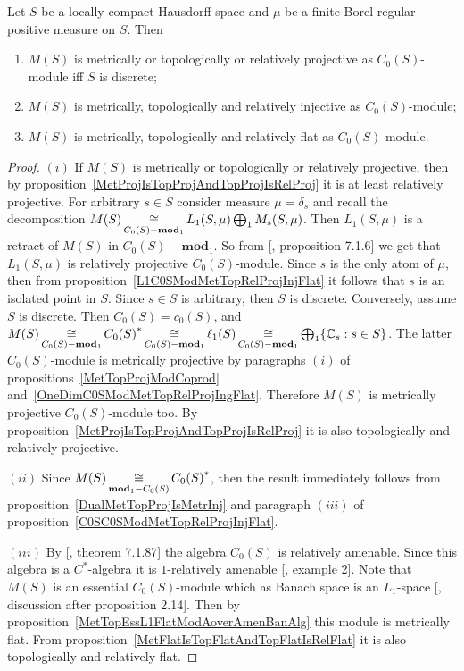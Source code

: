 \begin{proposition}\label{MSC0SModMetTopRelProjIngFlat} Let $S$ be a locally
compact Hausdorff space and $\mu$ be a finite Borel regular positive measure on
$S$. Then

\begin{enumerate}[label = (\roman*)]
    \item $M(S)$ is metrically or topologically or relatively projective as
    $C_0(S)$-module iff $S$ is discrete; 

    \item $M(S)$ is metrically, topologically and relatively injective as
    $C_0(S)$-module; 

    \item $M(S)$ is metrically, topologically and relatively flat as
    $C_0(S)$-module.
\end{enumerate}
\end{proposition}
\begin{proof} $(i)$ If $M(S)$ is metrically or topologically or relatively
projective, then by proposition~\ref{MetProjIsTopProjAndTopProjIsRelProj} it is
at least relatively projective. For arbitrary $s\in S$ consider measure
$\mu=\delta_s$ and recall the decomposition
$M(S)\mathop{\mathbin{\cong}}\limits_{C_0(S)-\mathbf{mod}_1}L_1(S,\mu)\bigoplus_1 M_s(S,\mu)$. Then
$L_1(S,\mu)$ is a retract of $M(S)$ in $C_0(S)-\mathbf{mod}_1$. So from
[\cite{HelBanLocConvAlg}, proposition 7.1.6] we get that $L_1(S,\mu)$ is
relatively projective $C_0(S)$-module. Since $s$ is the only atom of $\mu$, then
from proposition~\ref{L1C0SModMetTopRelProjInjFlat} it follows that $s$ is an
isolated point in $S$. Since $s\in S$ is arbitrary, then $S$ is discrete.
Conversely, assume $S$ is discrete. Then $C_0(S)=c_0(S)$, and
$M(S)
\mathop{\mathbin{\cong}}\limits_{C_0(S)-\mathbf{mod}_1}{C_0(S)}^*
\mathop{\mathbin{\cong}}\limits_{C_0(S)-\mathbf{mod}_1}\ell_1(S)
\mathop{\mathbin{\cong}}\limits_{C_0(S)-\mathbf{mod}_1}
\bigoplus_1 \{\mathbb{C}_s:s\in S \}$. The latter $C_0(S)$-module is metrically
projective by paragraphs $(i)$ of propositions~\ref{MetTopProjModCoprod}
and~\ref{OneDimC0SModMetTopRelProjIngFlat}. Therefore $M(S)$ is metrically
projective $C_0(S)$-module too. By
proposition~\ref{MetProjIsTopProjAndTopProjIsRelProj} it is also topologically
and relatively projective.

$(ii)$ Since $M(S)\mathop{\mathbin{\cong}}\limits_{\mathbf{mod}_1-C_0(S)}{C_0(S)}^*$, then the result
immediately follows from proposition~\ref{DualMetTopProjIsMetrInj} and paragraph
$(iii)$ of proposition~\ref{C0SC0SModMetTopRelProjInjFlat}.

$(iii)$ By [\cite{HelBanLocConvAlg}, theorem 7.1.87] the algebra $C_0(S)$ is
relatively amenable. Since this algebra is a $C^*$-algebra it is $1$-relatively 
amenable [\cite{RundeAmenConstFour}, example 2]. Note that $M(S)$ is 
an essential $C_0(S)$-module which as Banach space is an $L_1$-space
[\cite{DalLauSecondDualOfMeasAlg}, discussion after proposition 2.14]. Then by
proposition~\ref{MetTopEssL1FlatModAoverAmenBanAlg} this module is metrically
flat. From proposition~\ref{MetFlatIsTopFlatAndTopFlatIsRelFlat} it is also
topologically and relatively flat.
\end{proof}

